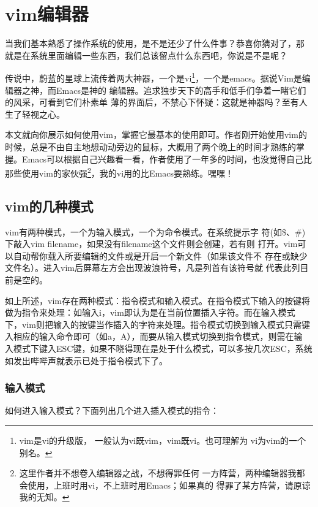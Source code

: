 \chapter{vim编辑器}
\label{sec:vimUsage}

当我们基本熟悉了操作系统的使用，是不是还少了什么件事？恭喜你猜对了，那
就是在系统里面编辑一些东西，我们总该留点什么东西吧，你说是不是呢？

传说中，蔚蓝的星球上流传着两大神器，一个是vi\footnote{vim是vi的升级版，
  一般认为vi既vim，vim既vi。也可理解为
  vi为vim的一个别名。}，一个是emacs。据说Vim是编辑器之神，而Emacs是神的
编辑器。追求独步天下的高手和低手们争着一睹它们的风采，可看到它们朴素单
薄的界面后，不禁心下怀疑：这就是神器吗？至有人生了轻视之心。

本文就向你展示如何使用vim，掌握它最基本的使用即可。作者刚开始使用vim的
时候，总是不由自主地想动动旁边的鼠标，大概用了两个晚上的时间才熟练的掌
握。Emacs可以根据自己兴趣看一看，作者使用了一年多的时间，也没觉得自己比
那些使用vim的家伙强\footnote{这里作者并不想卷入编辑器之战，不想得罪任何
  一方阵营，两种编辑器我都会使用，上班时用vi，不上班时用Emacs；如果真的
  得罪了某方阵营，请原谅我的无知。}，我的vi用的比Emacs要熟练。嘿嘿！

\section{vim的几种模式}
\label{sec:vimMode}

vim有两种模式，一个为输入模式，一个为命令模式。在系统提示字
符(如\$、\#)下敲入vim filename，如果没有filename这个文件则会创建，若有则
打开。vim可以自动帮你载入所要编辑的文件或是开启一个新文件（如果该文件不
存在或缺少文件名）。进入vim后屏幕左方会出现波浪符号，凡是列首有该符号就
代表此列目前是空的。

如上所述，vim存在两种模式：指令模式和输入模式。在指令模式下输入的按键将
做为指令来处理：如输入i，vim即认为是在当前位置插入字符。而在输入模式
下，vim则把输入的按键当作插入的字符来处理。指令模式切换到输入模式只需键
入相应的输入命令即可（如a，A），而要从输入模式切换到指令模式，则需在输
入模式下键入ESC键，如果不晓得现在是处于什么模式，可以多按几次ESC，系统
如发出哔哔声就表示已处于指令模式下了。

\subsection{输入模式}

如何进入输入模式？下面列出几个进入插入模式的指令：

